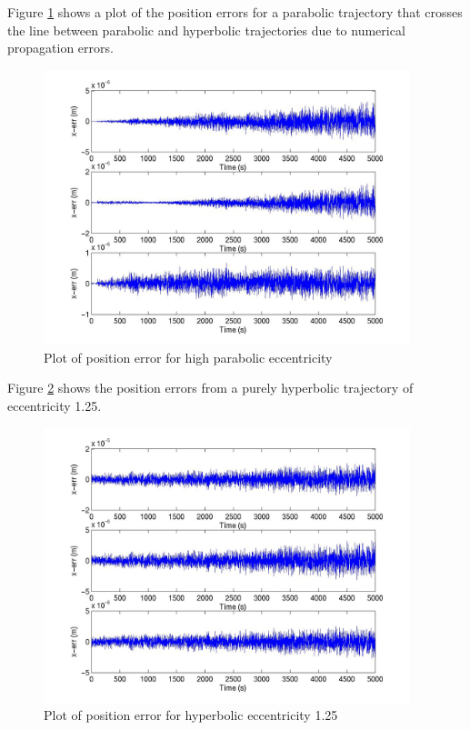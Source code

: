 \begin{description}
Figure \ref{par_high_pos} shows a plot of the position errors for a parabolic
trajectory that crosses the line between parabolic and hyperbolic trajectories
due to numerical propagation errors.

\begin{figure}[h]
\begin{center}
\includegraphics[height=80mm]{JPGfiles/pos_err_par_1p01.jpg}
\caption{Plot of position error for high parabolic eccentricity}
\label{par_high_pos}
\end{center}
\end{figure}

Figure \ref{hyp_low_HM} shows the position errors from a purely hyperbolic
trajectory of eccentricity 1.25.

\begin{figure}[h]
\begin{center}
\includegraphics[height=80mm]{JPGfiles/pos_err_hyp_1p25_HM.jpg}
\caption{Plot of position error for hyperbolic eccentricity 1.25}
\label{hyp_low_HM}
\end{center}
\end{figure}


\end{description}
